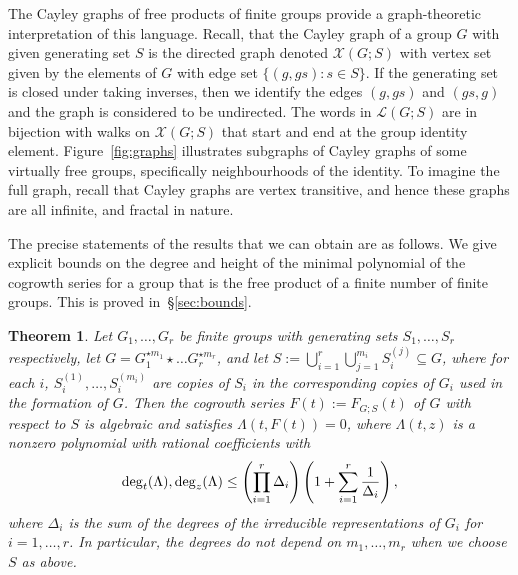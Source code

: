 \documentclass[11pt]{amsart}
\newtheorem{theorem}{Theorem}[section]
\theoremstyle{definition}
\begin{document}
The Cayley graphs of free products of finite groups provide a graph-theoretic
interpretation of this language. Recall,
that the Cayley graph of a group $G$ with given generating set $S$ is
the directed graph denoted $\mathcal{X}(G;S)$ with vertex set given by the elements of
$G$ with edge set $\{(g, gs): s\in S\}$. If the generating set is
closed under taking inverses, then we identify the edges $(g,gs)$ and $(gs,g)$ and the graph is considered to be undirected. The
words in $\mathcal{L}(G;S)$ are in bijection with walks on $\mathcal{X}(G;S)$
that start and end at the group identity element.
Figure~\ref{fig:graphs} illustrates subgraphs of Cayley graphs of some virtually
free groups, specifically neighbourhoods of the identity. To imagine
the full graph, recall that Cayley graphs are vertex transitive, and hence
these graphs are all infinite, and fractal in nature. 

The precise statements of the results that we can obtain are as
follows. We give explicit bounds on the degree and height of the minimal
polynomial of the cogrowth series for a group that is the free product
of a finite number of finite groups. This is proved in~\S\ref{sec:bounds}.
\begin{theorem}
\label{thm:mainbound}
   Let $G_1,\ldots ,G_r$ be finite groups with generating sets $S_1,\hdots, S_r$ respectively, let $G=G_1^{\star m_1}\star\dots G_r^{\star m_r}$, and let $S:=\bigcup_{i=1}^r \bigcup_{j=1}^{m_i} S_i^{(j)}\subseteq G$, where for each $i$, $S_i^{(1)},\ldots ,S_i^{(m_i)}$ are copies of $S_i$ in the corresponding copies of $G_i$ used in the formation of $G$.  Then the cogrowth series $F(t):=F_{G;S}(t)$ of $G$ with respect to $S$ is algebraic and satisfies $\Lambda(t,F(t))=0$, where $\Lambda(t,z)$ is a nonzero polynomial with rational coefficients with
 $${\rm deg}_t(\Lambda), {\rm deg}_z(\Lambda) \le \left(\prod_{i=1}^r \Delta_i\right) \left( 1 + \sum_{i=1}^r \frac{1}{\Delta_i} \right),$$
 where
   $\Delta_i$ is the sum of the degrees of the irreducible representations of $G_i$ for $i=1,\ldots ,r$.
In particular, the degrees do not depend on $m_1,\ldots ,m_r$ when we choose
 $S$ as above.
 \end{theorem}
\end{document}
